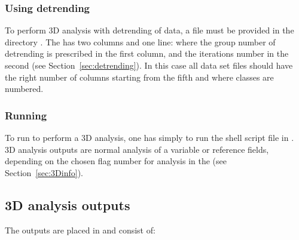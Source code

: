 \subsubsection{Using detrending}


To perform \diva 3D analysis with detrending of data, a  file must be provided in the directory . The  has two columns and one line: where the group number of detrending is prescribed in the first column, and the iterations number in the second (see Section~\ref{sec:detrending}). In this case all data set files should have the right number of columns starting from the fifth and where classes are numbered.


\begin{center}
\end{center}



\subsubsection{Running }

To run \diva to perform a 3D analysis, one has simply to run the shell script file  in . \diva 3D analysis outputs are normal analysis of a variable or reference fields, depending on the chosen flag number for analysis in the  (see Section~\ref{sec:3Dinfo}).


\subsection{\diva 3D analysis outputs}

The outputs are placed in  and consist of:

